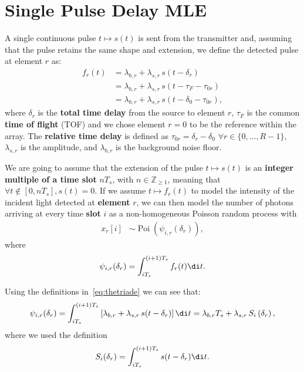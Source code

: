 \section{Single Pulse Delay MLE}
\label{sec:Single-Pulse-Delay-Estimation}

A single continuous pulse \(t\mapsto s(t)\) is sent from the transmitter and, assuming that the pulse retains the same shape and extension, we define the detected pulse at element \(r\) as:
\begin{equation}
\begin{aligned}
f_r(t)
&=\lambda_{b,r}+\lambda_{s,r} \, s(t-\delta_{r})\\
&=\lambda_{b,r}+\lambda_{s,r} \, s(t-\tau_{F}-\tau_{0r})\\
&=\lambda_{b,r}+\lambda_{s,r} \, s(t-\delta_{0}-\tau_{0r}),
\end{aligned}
\label{eq:thetriade}
\end{equation}
where \(\delta_r\) is the \textbf{total time delay} from the source to element \(r\), \(\tau_F\) is the common \textbf{time of flight} (TOF) and we chose element \(r=0\) to be the reference within the array. The \textbf{relative time delay} is defined as \(\tau_{0r}=\delta_r-\delta_0\) \(\forall r\in\{0,\ldots,R-1\}\), \(\lambda_{s,r}\) is the amplitude, and \(\lambda_{b,r}\) is the background noise floor.

\noindent
We are going to assume that the extension of the pulse \(t\mapsto s(t)\) is an \textbf{integer multiple of a time slot} \(nT_s\), with \(n \in \mathbb{Z}_{\geq1}\), meaning that \(\forall t\notin [0,nT_s], s(t)=0\).
\noindent
If we assume \(t \mapsto f_r(t)\) to model the intensity of the incident light detected at \textbf{element} \(r\), we can then model the number of photons arriving at every time \textbf{slot} \(i\) as a non-homogeneous Poisson random process with
\begin{equation}
\begin{aligned}
x_r[i]
& \sim \operatorname{Poi}\left(\psi_{i,r}(\delta_r)\right),
\end{aligned}
\end{equation}
where
\begin{equation}
\psi_{i,r}(\delta_r) = \int_{iT_s}^{(i+1)T_s}f_r(t) \di t.
\end{equation}

\noindent
Using the definitions in~\eqref{eq:thetriade} we can see that:
\begin{equation}
\psi_{i,r}(\delta_r)
= \int_{iT_s}^{(i+1)T_s} \left[ \lambda_{b,r}+\lambda_{s,r} \, s(t-\delta_{r}) \right] \di t
= \lambda_{b,r} T_s+\lambda_{s,r}\, S_i\left(\delta_r\right),
\label{eq:model}
\end{equation}
where we used the definition
\begin{equation}
S_i(\delta_r) = \int_{iT_s}^{(i+1)T_s} s(t-\delta_r) \di t.
\label{eq:thebigs}
\end{equation}

